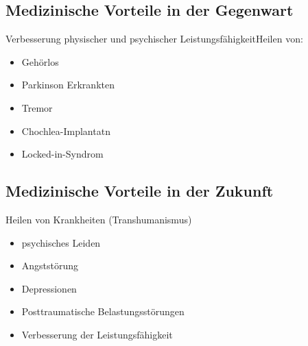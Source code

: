 \documentclass[aspectratio=169,16pt,xcolor=table]{beamer}
\begin{document}
\subsection{Medizinische Vorteile in der Gegenwart}
\begin{frame} %
Verbesserung physischer und psychischer Leistungsfähigkeit\newline Heilen von:
	\begin{itemize}
		\item{Gehörlos}
		\item{Parkinson Erkrankten}
		\item{Tremor}
            \item{Chochlea-Implantatn}
            \item{Locked-in-Syndrom}
        \end{itemize}
\end{frame}



\subsection{Medizinische Vorteile in der Zukunft}
\begin{frame} %
Heilen von Krankheiten (Transhumanismus)
	\begin{itemize}
		\item{psychisches Leiden}
		\item{Angststörung}
		\item{Depressionen}
            \item{Posttraumatische Belastungsstörungen}
            \item{Verbesserung der Leistungsfähigkeit}
        \end{itemize}
\end{frame}





\end{document}
